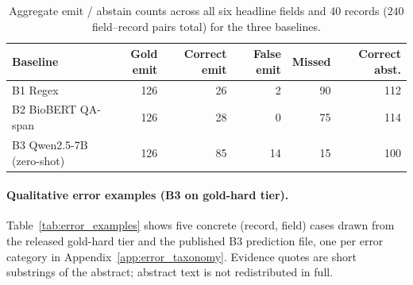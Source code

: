 \documentclass{article}
\begin{document}
\begin{table}[h]
\centering
\caption{Aggregate emit / abstain counts across all six headline
fields and 40 records ($240$ field--record pairs total) for the three
baselines.}
\label{tab:emit_abstain_agg}
\small
\setlength{\tabcolsep}{6pt}
\begin{tabular}{@{}lrrrrr@{}}
\toprule
\textbf{Baseline} & \textbf{Gold emit} & \textbf{Correct emit} & \textbf{False emit} & \textbf{Missed} & \textbf{Correct abst.} \\
\midrule
B1 Regex                  & 126 & 26 &  2 & 90 & 112 \\
B2 BioBERT QA-span        & 126 & 28 &  0 & 75 & 114 \\
B3 Qwen2.5-7B (zero-shot) & 126 & 85 & 14 & 15 & 100 \\
\bottomrule
\end{tabular}
\end{table}

\paragraph{Qualitative error examples (B3 on gold-hard tier).}
Table~\ref{tab:error_examples} shows five concrete (record, field)
cases drawn from the released gold-hard tier and the published B3
prediction file, one per error category in
Appendix~\ref{app:error_taxonomy}. Evidence quotes are short
substrings of the abstract; abstract text is not redistributed in full.
\end{document}
